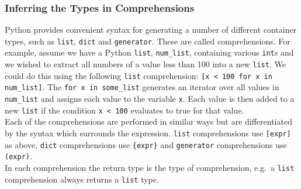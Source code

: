 \documentclass[12pt, titlepage]{article}
\begin{document}
\subsubsection{Inferring the Types in Comprehensions}
Python provides convenient syntax for generating a number of different container types, such as \texttt{list}, \texttt{dict} and \texttt{generator}. These are called comprehensions. For example, assume we have a Python \texttt{list}, \texttt{num\_list}, containing various \texttt{int}s and we wished to extract all numbers of a value less than 100 into a new \texttt{list}. We could do this using the following \texttt{list} comprehension: \texttt{[x < 100 for x in num\_list]}. The \texttt{for x in some\_list} generates an iterator over all values in \texttt{num\_list} and assigns each value to the variable \texttt{x}. Each value is then added to a new \texttt{list} if the condition \texttt{x < 100} evaluates to true for that value. \\
\indent Each of the comprehensions are performed in similar ways but are differentiated by the syntax which surrounds the expression. \texttt{list} comprehensions use \texttt{[expr]} as above, \texttt{dict} comprehensions use \texttt{\{expr\}} and \texttt{generator} comprehensions use \texttt{(expr)}. \\
\indent In each comprehension the return type is the type of comprehension, e.g.\ a \texttt{list} comprehension always returns a \texttt{list} type.
\end{document}
